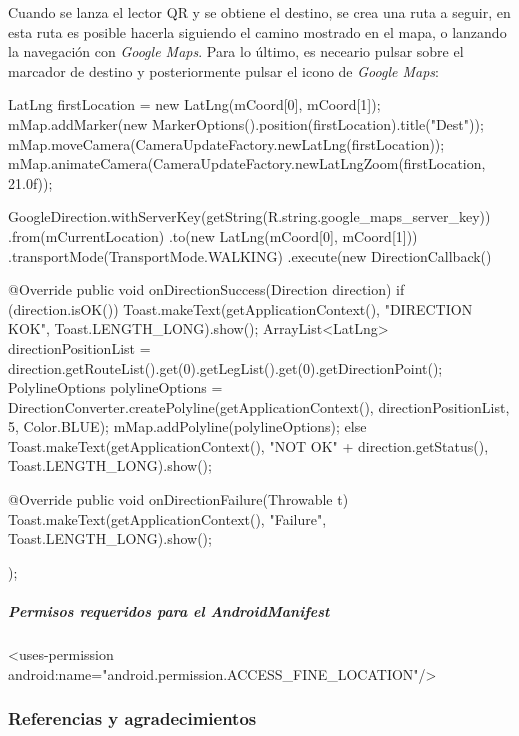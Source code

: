 \documentclass[	DIV=calc,%
							paper=a4,%
							fontsize=11pt]{scrartcl}	 					%
\begin{document}
Cuando se lanza el lector QR y se obtiene el destino, se crea una ruta a
seguir, en esta ruta es posible hacerla siguiendo el camino mostrado en
el mapa, o lanzando la navegación con \emph{Google Maps}. Para lo
último, es neceario pulsar sobre el marcador de destino y posteriormente
pulsar el icono de \emph{Google Maps}:

\begin{javacode}
	LatLng firstLocation = new LatLng(mCoord[0], mCoord[1]);
	mMap.addMarker(new MarkerOptions().position(firstLocation).title("Dest"));
	mMap.moveCamera(CameraUpdateFactory.newLatLng(firstLocation));
	mMap.animateCamera(CameraUpdateFactory.newLatLngZoom(firstLocation, 21.0f));

	GoogleDirection.withServerKey(getString(R.string.google_maps_server_key))
					.from(mCurrentLocation)
					.to(new LatLng(mCoord[0], mCoord[1]))
					.transportMode(TransportMode.WALKING)
					.execute(new DirectionCallback() {
							@Override
							public void onDirectionSuccess(Direction direction) {
									if (direction.isOK()) {
											Toast.makeText(getApplicationContext(), "DIRECTION KOK", Toast.LENGTH_LONG).show();
											ArrayList<LatLng> directionPositionList = direction.getRouteList().get(0).getLegList().get(0).getDirectionPoint();
											PolylineOptions polylineOptions = DirectionConverter.createPolyline(getApplicationContext(), directionPositionList, 5, Color.BLUE);
											mMap.addPolyline(polylineOptions);
									} else {
											Toast.makeText(getApplicationContext(), "NOT OK" + direction.getStatus(), Toast.LENGTH_LONG).show();
									}
							}

							@Override
							public void onDirectionFailure(Throwable t) {
									Toast.makeText(getApplicationContext(), "Failure", Toast.LENGTH_LONG).show();
							}
					});
\end{javacode}

\subparagraph{Permisos requeridos para el
AndroidManifest}\label{permisos-requeridos-para-el-androidmanifest-1}

\begin{xmlcode}
<uses-permission android:name="android.permission.ACCESS_FINE_LOCATION"/>
\end{xmlcode}

\subsubsection{Referencias y
agradecimientos}\label{referencias-y-agradecimientos}
\end{document}

